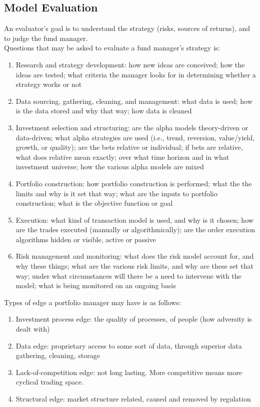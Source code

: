 \subsection{Model Evaluation}

An evaluator's goal is to understand the strategy (risks, sources of returns), and to judge the fund manager.\\

Questions that may be asked to evaluate a fund manager's strategy is:
\begin{enumerate}[label=\arabic*.]
\setlength{\itemsep}{0pt}
\item Research and strategy development: how new ideas are conceived; how the ideas are tested; what criteria the manager looks for in determining whether a strategy works or not
\item Data sourcing, gathering, cleaning, and management: what data is used; how is the data stored and why that way; how data is cleaned
\item Investment selection and structuring: are the alpha models theory-driven or data-driven; what alpha strategies are used (i.e., trend, reversion, value/yield, growth, or quality); are the bets relative or individual; if bets are relative, what does relative mean exactly; over what time horizon and in what investment universe; how the various alpha models are mixed
\item Portfolio construction: how portfolio construction is performed; what the the limits and why is it set that way; what are the inputs to portfolio construction; what is the objective function or goal
\item Execution: what kind of transaction model is used, and why is it chosen; how are the trades executed (manually or algorithmically); are the order execution algorithms hidden or visible, active or passive
\item Risk management and monitoring: what does the risk model account for, and why these things; what are the various risk limits, and why are these set that way; under what circumstances will there be a need to intervene with the model; what is being monitored on an ongoing basis
\end{enumerate}

Types of edge a portfolio manager may have is as follows:
\begin{enumerate}[label=\roman*.]
\setlength{\itemsep}{0pt}
\item Investment process edge: the quality of processes, of people (how adversity is dealt with)
\item Data edge: proprietary access to some sort of data, through superior data gathering, cleaning, storage
\item Lack-of-competition edge: not long lasting. More competitive means more cyclical trading space.
\item Structural edge: market structure related, caused and removed by regulation
\end{enumerate}

